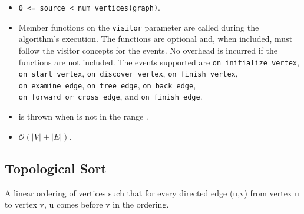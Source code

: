 \begin{itemdescr}
\preconditions
            \begin{itemize}
                  \item
                        \lstinline{0 <= source < num_vertices(graph)}.
            \end{itemize}
      \pnum\effects
            \begin{itemize}
                  \item Member functions on the \lstinline{visitor} parameter are called during the algorithm's execution.
                        The functions are optional and, when included, must follow the visitor concepts for the events.
                        No overhead is incurred if the functions are not included.
                        The events supported are \lstinline{on_initialize_vertex}, \lstinline{on_start_vertex},
                        \lstinline{on_discover_vertex}, \lstinline{on_finish_vertex}, 
                        \lstinline{on_examine_edge}, \lstinline{on_tree_edge}, \lstinline{on_back_edge},
                        \lstinline{on_forward_or_cross_edge}, and \lstinline{on_finish_edge}.
            \end{itemize}
      \pnum\throws
            \begin{itemize}
                  \item {} is thrown when  is not in the range .
            \end{itemize}
      \pnum\complexity
            \begin{itemize}
                  \item $\mathcal{O}(|V| + |E|)$.
            \end{itemize}
\end{itemdescr}

\subsection{Topological Sort}
A linear ordering of vertices such that for every directed edge (u,v) from vertex u to vertex v, u comes before v in the ordering.

